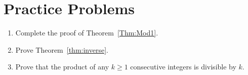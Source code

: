 \documentclass[11pt]{article}
\newcounter{thm}
\begin{document}
\section{Practice Problems}\label{scn:problems}

\begin{enumerate}
    \item Complete the proof of Theorem~\ref{Thm:Mod1}.
    \item Prove Theorem~\ref{thm:inverse}.
    \item Prove that the product of any $k \ge 1$ consecutive integers is divisible by $k$.
\end{enumerate}
\end{document}

